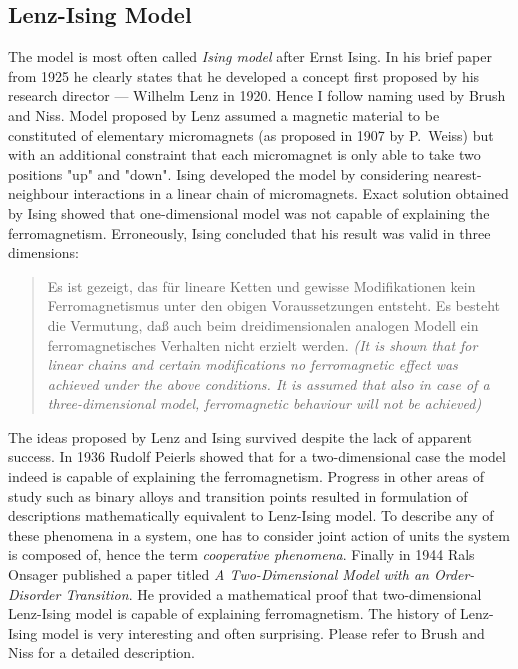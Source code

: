 \subsection{Lenz-Ising Model}
The model is most often called \textit{Ising model} after Ernst Ising. In his brief paper from 1925 he clearly states that he developed a concept first proposed by his research director --- Wilhelm Lenz in 1920\cite{ising_beitrag_1925}. Hence I follow naming used by Brush and Niss\cite{brush_history_1967}\cite{niss_history_2005}. Model proposed by Lenz assumed a magnetic material to be constituted of elementary micromagnets (as proposed in 1907 by P.~Weiss) but with an additional constraint that each micromagnet is only able to take two positions "up" and "down". Ising developed the model by considering nearest-neighbour interactions in a linear chain of micromagnets. Exact solution obtained by Ising showed that one-dimensional model was not capable of explaining the ferromagnetism. Erroneously, Ising concluded that his result was valid in three dimensions:
\begin{quote}
Es ist gezeigt, das für lineare Ketten und gewisse Modifikationen kein Ferromagnetismus unter den obigen Voraussetzungen entsteht. Es besteht die Vermutung, daß auch beim dreidimensionalen analogen Modell ein ferromagnetisches Verhalten nicht erzielt werden. \textit{(It is shown that for linear chains and certain modifications no ferromagnetic effect was achieved under the above conditions. It is assumed that also in case of a three-dimensional model, ferromagnetic behaviour will not be achieved)}\cite{ising_beitrag_1925}
\end{quote}
The ideas proposed by Lenz and Ising survived despite the lack of apparent success. In 1936 Rudolf Peierls showed that for a two-dimensional case the model indeed is capable of explaining the ferromagnetism. Progress in other areas of study such as binary alloys and transition points resulted in formulation of descriptions mathematically equivalent to Lenz-Ising model. To describe any of these phenomena in a system, one has to consider joint action of units the system is composed of, hence the term \textit{cooperative phenomena}. Finally in 1944 Rals Onsager published a paper titled \textit{A Two-Dimensional Model with an Order-Disorder Transition}. He provided a mathematical proof that two-dimensional Lenz-Ising model is capable of explaining ferromagnetism. The history of Lenz-Ising model is very interesting and often surprising. Please refer to Brush \cite{brush_history_1967} and Niss\cite{niss_history_2005} for a detailed description.


